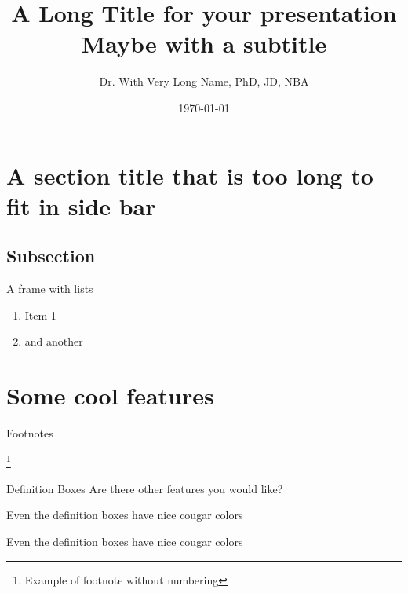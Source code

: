\documentclass{beamer}
\title[Short Title]{A Long Title for your presentation \\ {\small Maybe with a subtitle}}
\author[Dr. Name]{Dr. With Very Long Name, PhD, JD, NBA}
\institute[WSU]{Washington State University}
\date{\today}
\newcommand\blfootnote[1]{%
  \begingroup
  \renewcommand\thefootnote{}\footnote{#1}%
  \addtocounter{footnote}{-1}%
  \endgroup
}
\begin{document}
\begin{frame}
 \maketitle
\end{frame}
%


\section[Short Section]{A section title that is too long to fit in side bar}

\subsection{Subsection}


\begin{frame}{A frame with lists}
 \begin{enumerate}
  \item Item 1
  \item and another
 \end{enumerate}
\end{frame}


\section{Some cool features}

\begin{frame}{Footnotes}

 \blfootnote{\tiny Example of footnote without numbering}
\end{frame}

\begin{frame}{Definition Boxes}
 Are there other features you would like?

 \begin{definition}[Concept]
  Even the definition boxes have nice cougar colors
 \end{definition}

 \begin{example}
  Even the definition boxes have nice cougar colors
 \end{example}

\end{frame}
\end{document}
